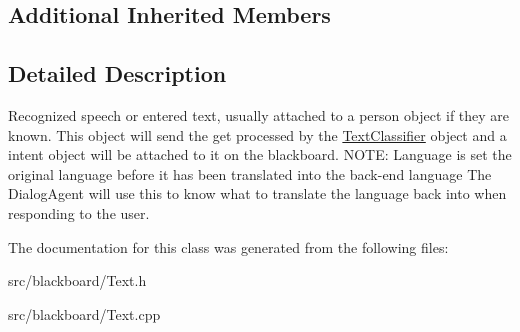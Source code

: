 \subsection*{Additional Inherited Members}


\subsection{Detailed Description}
Recognized speech or entered text, usually attached to a person object if they are known. This object will send the get processed by the \hyperlink{class_text_classifier}{Text\+Classifier} object and a intent object will be attached to it on the blackboard. N\+O\+TE\+: Language is set the original language before it has been translated into the back-\/end language The Dialog\+Agent will use this to know what to translate the language back into when responding to the user. 

The documentation for this class was generated from the following files\+:\begin{DoxyCompactItemize}
\item 
src/blackboard/Text.\+h\item 
src/blackboard/Text.\+cpp\end{DoxyCompactItemize}

